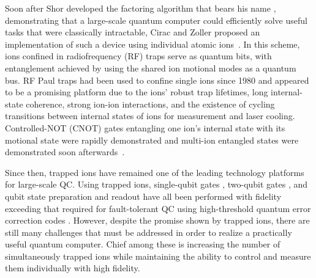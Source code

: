 \documentclass[%
reprint,
 amsmath,amssymb,
]{revtex4-1}
\begin{document}
Soon after Shor developed the factoring algorithm that bears his name \cite{ShorAlgorithm}, demonstrating that a large-scale quantum computer could efficiently solve useful tasks that were classically intractable, Cirac and Zoller proposed an implementation of such a device using individual atomic ions~\cite{CiracZollerGate}.  In this scheme, ions confined in radiofrequency (RF) traps serve as quantum bits, with entanglement achieved by using the shared ion motional modes as a quantum bus. RF Paul traps had been used to confine single ions since 1980 \cite{NeuhauserTrappedIon1980} and appeared to be a promising platform due to the ions' robust trap lifetimes, long internal-state coherence, strong ion-ion interactions, and the existence of cycling transitions between internal states of ions for measurement and laser cooling. Controlled-NOT (CNOT) gates entangling one ion's internal state with its motional state were rapidly demonstrated \cite{MonroeCNOT1995} and multi-ion entangled states were demonstrated soon afterwards~\cite{TurchetteEntanglement1998, Sackett4IonEntanglement2000}.

Since then, trapped ions have remained one of the leading technology platforms for large-scale QC. Using trapped ions, single-qubit gates \cite{NIST:HifiMicrogate:12}, two-qubit gates \cite{BenhelmMSGate2008}, and qubit state preparation and readout \cite{MyersonReadoutIons2008} have all been performed with fidelity exceeding that required for fault-tolerant QC using high-threshold quantum error correction codes \cite{RaussendorfSurfaceCode2007}.  However, despite the promise shown by trapped ions, there are still many challenges that must be addressed in order to realize a practically useful quantum computer.  Chief among these is increasing the number of simultaneously trapped ions while maintaining the ability to control and measure them individually with high fidelity.

\end{document}
